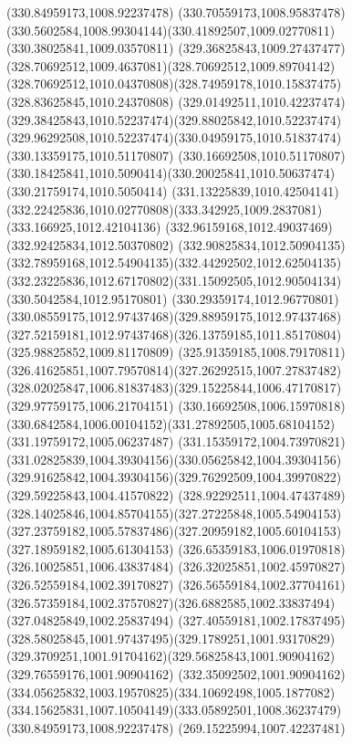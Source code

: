 {{	\moveto(330.84959173,1008.92237478)
	\curveto(330.70559173,1008.95837478)(330.5602584,1008.99304144)(330.41892507,1009.02770811)
	\lineto(330.38025841,1009.03570811)
	\curveto(329.36825843,1009.27437477)(328.70692512,1009.4637081)(328.70692512,1009.89704142)
	\curveto(328.70692512,1010.04370808)(328.74959178,1010.15837475)(328.83625845,1010.24370808)
	\curveto(329.01492511,1010.42237474)(329.38425843,1010.52237474)(329.88025842,1010.52237474)
	\curveto(329.96292508,1010.52237474)(330.04959175,1010.51837474)(330.13359175,1010.51170807)
	\lineto(330.16692508,1010.51170807)
	\curveto(330.18425841,1010.5090414)(330.20025841,1010.50637474)(330.21759174,1010.5050414)
	\curveto(331.13225839,1010.42504141)(332.22425836,1010.02770808)(333.342925,1009.2837081)
	\lineto(333.166925,1012.42104136)
	\lineto(332.96159168,1012.49037469)
	\lineto(332.92425834,1012.50370802)
	\curveto(332.90825834,1012.50904135)(332.78959168,1012.54904135)(332.44292502,1012.62504135)
	\curveto(332.23225836,1012.67170802)(331.15092505,1012.90504134)(330.5042584,1012.95170801)
	\curveto(330.29359174,1012.96770801)(330.08559175,1012.97437468)(329.88959175,1012.97437468)
	\curveto(327.52159181,1012.97437468)(326.13759185,1011.85170804)(325.98825852,1009.81170809)
	\curveto(325.91359185,1008.79170811)(326.41625851,1007.79570814)(327.26292515,1007.27837482)
	\curveto(328.02025847,1006.81837483)(329.15225844,1006.47170817)(329.97759175,1006.21704151)
	\lineto(330.16692508,1006.15970818)
	\curveto(330.6842584,1006.00104152)(331.27892505,1005.68104152)(331.19759172,1005.06237487)
	\curveto(331.15359172,1004.73970821)(331.02825839,1004.39304156)(330.05625842,1004.39304156)
	\curveto(329.91625842,1004.39304156)(329.76292509,1004.39970822)(329.59225843,1004.41570822)
	\curveto(328.92292511,1004.47437489)(328.14025846,1004.85704155)(327.27225848,1005.54904153)
	\curveto(327.23759182,1005.57837486)(327.20959182,1005.60104153)(327.18959182,1005.61304153)
	\lineto(326.65359183,1006.01970818)
	\lineto(326.10025851,1006.43837484)
	\lineto(326.32025851,1002.45970827)
	\lineto(326.52559184,1002.39170827)
	\lineto(326.56559184,1002.37704161)
	\curveto(326.57359184,1002.37570827)(326.6882585,1002.33837494)(327.04825849,1002.25837494)
	\curveto(327.40559181,1002.17837495)(328.58025845,1001.97437495)(329.1789251,1001.93170829)
	\curveto(329.3709251,1001.91704162)(329.56825843,1001.90904162)(329.76559176,1001.90904162)
	\curveto(332.35092502,1001.90904162)(334.05625832,1003.19570825)(334.10692498,1005.1877082)
	\curveto(334.15625831,1007.10504149)(333.05892501,1008.36237479)(330.84959173,1008.92237478)
	\moveto(269.15225994,1007.42237481)
}}
